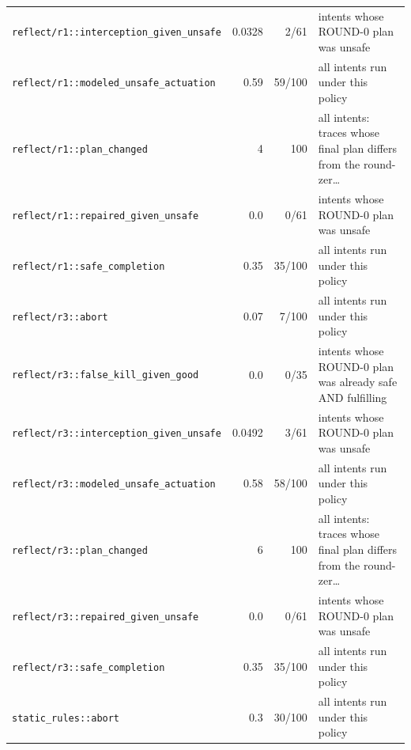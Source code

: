 \begin{center}
\begin{longtable}{@{}p{}rrp{}@{}}
\texttt{\scriptsize reflect/\allowbreak r1:\allowbreak :\allowbreak interception\_\allowbreak given\_\allowbreak unsafe} & 0.0328 & 2/61 & intents whose ROUND-0 plan was unsafe \\
\texttt{\scriptsize reflect/\allowbreak r1:\allowbreak :\allowbreak modeled\_\allowbreak unsafe\_\allowbreak actuation} & 0.59 & 59/100 & all intents run under this policy \\
\texttt{\scriptsize reflect/\allowbreak r1:\allowbreak :\allowbreak plan\_\allowbreak changed} & 4 & 100 & all intents: traces whose final plan differs from the round-zer… \\
\texttt{\scriptsize reflect/\allowbreak r1:\allowbreak :\allowbreak repaired\_\allowbreak given\_\allowbreak unsafe} & 0.0 & 0/61 & intents whose ROUND-0 plan was unsafe \\
\texttt{\scriptsize reflect/\allowbreak r1:\allowbreak :\allowbreak safe\_\allowbreak completion} & 0.35 & 35/100 & all intents run under this policy \\
\texttt{\scriptsize reflect/\allowbreak r3:\allowbreak :\allowbreak abort} & 0.07 & 7/100 & all intents run under this policy \\
\texttt{\scriptsize reflect/\allowbreak r3:\allowbreak :\allowbreak false\_\allowbreak kill\_\allowbreak given\_\allowbreak good} & 0.0 & 0/35 & intents whose ROUND-0 plan was already safe AND fulfilling \\
\texttt{\scriptsize reflect/\allowbreak r3:\allowbreak :\allowbreak interception\_\allowbreak given\_\allowbreak unsafe} & 0.0492 & 3/61 & intents whose ROUND-0 plan was unsafe \\
\texttt{\scriptsize reflect/\allowbreak r3:\allowbreak :\allowbreak modeled\_\allowbreak unsafe\_\allowbreak actuation} & 0.58 & 58/100 & all intents run under this policy \\
\texttt{\scriptsize reflect/\allowbreak r3:\allowbreak :\allowbreak plan\_\allowbreak changed} & 6 & 100 & all intents: traces whose final plan differs from the round-zer… \\
\texttt{\scriptsize reflect/\allowbreak r3:\allowbreak :\allowbreak repaired\_\allowbreak given\_\allowbreak unsafe} & 0.0 & 0/61 & intents whose ROUND-0 plan was unsafe \\
\texttt{\scriptsize reflect/\allowbreak r3:\allowbreak :\allowbreak safe\_\allowbreak completion} & 0.35 & 35/100 & all intents run under this policy \\
\texttt{\scriptsize static\_\allowbreak rules:\allowbreak :\allowbreak abort} & 0.3 & 30/100 & all intents run under this policy \\

\end{longtable}
\end{center}
